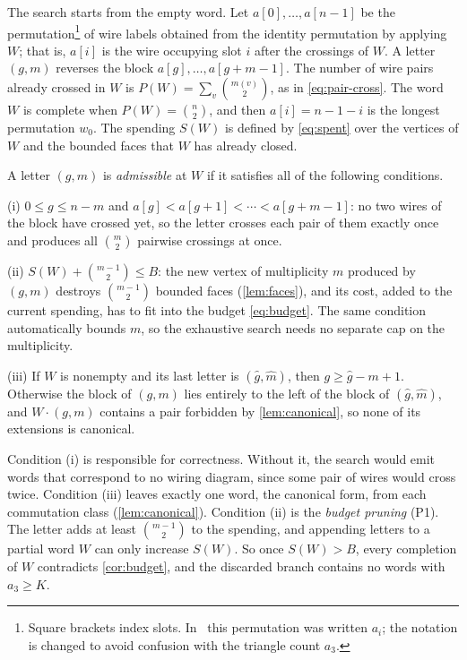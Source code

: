 \noindent
The search starts from the empty word.
Let $a[0],\ldots,a[n-1]$ be the permutation\footnote{Square brackets index slots.
In~\cite[Section~4]{pu26b} this permutation was written $a_i$;
the notation is changed to avoid confusion with the triangle count $a_3$.}
of wire labels obtained from the identity permutation by applying $W$; that is, $a[i]$
is the wire occupying slot $i$ after the crossings of $W$.
A letter $(g,m)$ reverses the block $a[g],\ldots,a[g+m-1]$.
The number of wire pairs already crossed in $W$ is
$P(W)=\sum_v\binom{m(v)}2$, as in \eqref{eq:pair-cross}.
The word $W$ is complete when $P(W)=\binom n2$, and then $a[i]=n-1-i$ is the longest permutation $w_0$.
The spending $S(W)$ is defined by \eqref{eq:spent} over the vertices of $W$
and the bounded faces that $W$ has already closed.

A letter $(g,m)$ is \emph{admissible} at $W$ if it satisfies all of the following conditions.

(i) $0\le g\le n-m$ and $a[g]<a[g+1]<\cdots<a[g+m-1]$: no two wires of the block have crossed yet, so the letter crosses each pair of them exactly once and produces all $\binom m2$ pairwise crossings at once.

(ii) $S(W)+\binom{m-1}2\le B$: the new vertex of multiplicity $m$ produced by $(g,m)$ destroys $\binom{m-1}2$ bounded faces (\cref{lem:faces}), and its cost, added to the current spending, has to fit into the budget \eqref{eq:budget}.
The same condition automatically bounds $m$, so the exhaustive search needs no separate cap on the multiplicity.

(iii) If $W$ is nonempty and its last letter is $(\widehat g,\widehat m)$, then $g\ge \widehat g-m+1$. Otherwise the block of $(g,m)$ lies entirely to the left of the block of $(\widehat g,\widehat m)$, and $W\cdot(g,m)$ contains a pair forbidden by \cref{lem:canonical}, so none of its extensions is canonical.

Condition (i) is responsible for correctness. Without it, the search would emit words that correspond to no
wiring diagram, since some pair of wires would cross twice.
Condition (iii) leaves exactly one word, the canonical form, from each commutation class (\cref{lem:canonical}).
Condition (ii) is the \emph{budget pruning} (P1). The letter adds at least $\binom{m-1}2$ to the spending, and appending letters to a partial word $W$ can only increase $S(W)$. So once $S(W)>B$, every completion of $W$ contradicts \cref{cor:budget}, and the discarded branch contains no words with $a_3\ge K$.

